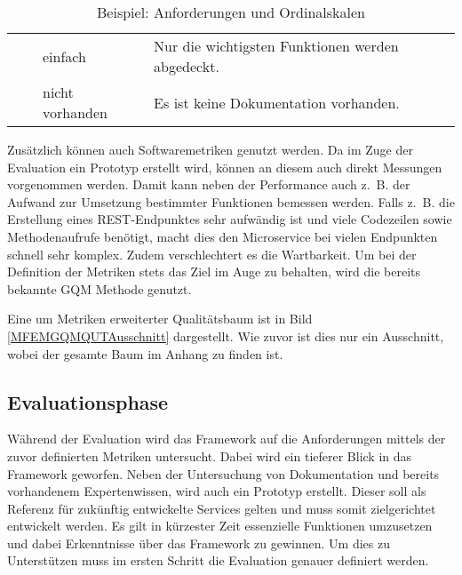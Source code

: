 \begin{table}[!htb]
{\begin{tabular}{p{3cm}|p{3cm}|p{2cm}|p{8cm}}
		\\ \cline{3-4} &                                                                                       
		& einfach & Nur die wichtigsten Funktionen werden abgedeckt.                                                                     
		\\ \cline{3-4} &                                                                                       
		& nicht vorhanden & Es ist keine Dokumentation vorhanden.                                                                                
		\\ \hline
	\end{tabular}
	}
	\caption[Beispiele für Ordinalskalen]{Beispiel: Anforderungen und Ordinalskalen}
	\label{OrdinalskalaBeispiele}
\end{table}
\FloatBarrier

Zusätzlich können auch Softwaremetriken genutzt werden. Da im Zuge der Evaluation ein Prototyp erstellt wird, können an diesem auch direkt Messungen vorgenommen werden. Damit kann neben der Performance auch z.~B. der Aufwand zur Umsetzung bestimmter Funktionen bemessen werden. Falls z.~B. die Erstellung eines \ac{REST}-Endpunktes sehr aufwändig ist und viele Codezeilen sowie Methodenaufrufe benötigt, macht dies den Microservice bei vielen Endpunkten schnell sehr komplex. Zudem verschlechtert es die Wartbarkeit.
Um bei der Definition der Metriken stets das Ziel im Auge zu behalten, wird die bereits bekannte \ac{GQM} Methode genutzt. 

Eine um Metriken erweiterter Qualitätsbaum ist in Bild \ref{MFEMGQMQUTAusschnitt} dargestellt. Wie zuvor ist dies nur ein Ausschnitt, wobei der gesamte Baum im Anhang zu finden ist.


\subsection{Evaluationsphase}


Während der Evaluation wird das Framework auf die Anforderungen mittels der zuvor definierten Metriken untersucht. Dabei wird ein tieferer Blick in das Framework geworfen. Neben der Untersuchung von Dokumentation und bereits vorhandenem Expertenwissen, wird auch ein Prototyp erstellt. Dieser soll als Referenz für zukünftig entwickelte Services gelten und muss somit zielgerichtet entwickelt werden. Es gilt in kürzester Zeit essenzielle Funktionen umzusetzen und dabei Erkenntnisse über das Framework zu gewinnen. Um dies zu Unterstützen muss im ersten Schritt die Evaluation genauer definiert werden.

